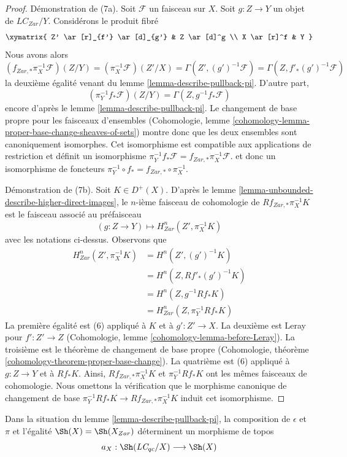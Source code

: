 \begin{proof}
\medskip\noindent
Démonstration de (7a). Soit $\mathcal{F}$ un faisceau sur $X$.
Soit $g : Z \to Y$ un objet de $\textit{LC}_{Zar}/Y$. Considérons le produit
fibré
$$
\xymatrix{
Z' \ar[r]_{f'} \ar[d]_{g'} & Z \ar[d]^g \\
X \ar[r]^f & Y
}
$$
Nous avons alors
$$
(f_{Zar, *}\pi_X^{-1}\mathcal{F})(Z/Y) =
(\pi_X^{-1}\mathcal{F})(Z'/X)  =
\Gamma(Z', (g')^{-1}\mathcal{F})  =
\Gamma(Z, f'_*(g')^{-1}\mathcal{F})
$$
la deuxième égalité venant du lemme \ref{lemma-describe-pullback-pi}.
D'autre part,
$$
(\pi_Y^{-1}f_*\mathcal{F})(Z/Y) = \Gamma(Z, g^{-1}f_*\mathcal{F})
$$
encore d'après le lemme \ref{lemma-describe-pullback-pi}.
Le changement de base propre pour les faisceaux d'ensembles
(Cohomologie, lemme
\ref{cohomology-lemma-proper-base-change-sheaves-of-sets}) montre donc que
les deux ensembles sont canoniquement isomorphes. Cet isomorphisme est
compatible aux applications de restriction et définit un isomorphisme
$\pi_Y^{-1}f_*\mathcal{F} = f_{Zar, *}\pi_X^{-1}\mathcal{F}$.
et donc un isomorphisme de foncteurs
$\pi_Y^{-1} \circ f_* = f_{Zar, *} \circ \pi_X^{-1}$.

\medskip\noindent
Démonstration de (7b). Soit $K \in D^+(X)$. D'après le
lemme \ref{lemma-unbounded-describe-higher-direct-images}, le $n$-ième
faisceau de cohomologie de $Rf_{Zar, *}\pi_X^{-1}K$ est le faisceau associé
au préfaisceau
$$
(g : Z \to Y) \longmapsto H^n_{Zar}(Z', \pi_X^{-1}K)
$$
avec les notations ci-dessus. Observons que
\begin{align*}
H^n_{Zar}(Z', \pi_X^{-1}K)
& =
H^n(Z', (g')^{-1}K) \\
& =
H^n(Z, Rf'_*(g')^{-1}K) \\
& =
H^n(Z, g^{-1}Rf_*K) \\
& =
H^n_{Zar}(Z, \pi_Y^{-1}Rf_*K)
\end{align*}
La première égalité est (6) appliqué à $K$ et à $g' : Z' \to X$.
La deuxième est Leray pour $f' : Z' \to Z$
(Cohomologie, lemme \ref{cohomology-lemma-before-Leray}).
La troisième est le théorème de changement de base propre
(Cohomologie, théorème \ref{cohomology-theorem-proper-base-change}).
La quatrième est (6) appliqué à $g : Z \to Y$ et à $Rf_*K$.
Ainsi, $Rf_{Zar, *}\pi_X^{-1}K$ et $\pi_Y^{-1}Rf_*K$ ont les mêmes faisceaux
de cohomologie. Nous omettons la vérification que le morphisme canonique de
changement de base $\pi_Y^{-1}Rf_*K \to Rf_{Zar, *}\pi_X^{-1}K$ induit cet
isomorphisme.
\end{proof}

\noindent
Dans la situation du lemme \ref{lemma-describe-pullback-pi}, la composition
de $\epsilon$ et $\pi$ et l'égalité $\Sh(X) = \Sh(X_{Zar})$ déterminent un
morphisme de topos
$$
a_X : \Sh(\textit{LC}_{qc}/X) \longrightarrow \Sh(X)
$$

